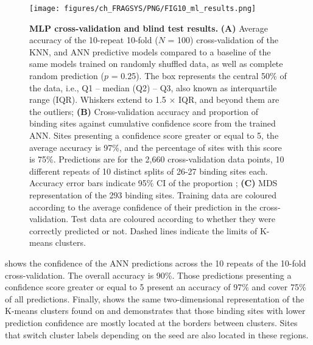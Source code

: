 \begin{figure}[ht!]
    \centering
    \texttt{[image: figures/ch\_FRAGSYS/PNG/FIG10\_ml\_results.png]}
    \caption[MLP cross-validation and blind test results]{\textbf{MLP cross-validation and blind test results.} \textbf{(A)} Average accuracy of the 10-repeat 10-fold ($N$ = 100) cross-validation of the KNN, and ANN predictive models compared to a baseline of the same models trained on randomly shuffled data, as well as complete random prediction ($p$ = 0.25). The box represents the central 50\% of the data, i.e., Q1 – median (Q2) – Q3, also known as interquartile range (IQR). Whiskers extend to 1.5 $\times$ IQR, and beyond them are the outliers; \textbf{(B)} Cross-validation accuracy and proportion of binding sites against cumulative confidence score from the trained ANN. Sites presenting a confidence score greater or equal to 5, the average accuracy is 97\%, and the percentage of sites with this score is 75\%. Predictions are for the 2,660 cross-validation data points, 10 different repeats of 10 distinct splits of 26-27 binding sites each. Accuracy error bars indicate 95\% CI of the proportion \cite{WILSON_197_PROP_CI}; \textbf{(C)} MDS representation of the 293 binding sites. Training data are coloured according to the average confidence of their prediction in the cross-validation. Test data are coloured according to whether they were correctly predicted or not. Dashed lines indicate the limits of K-means clusters.}
    \label{fig:MLP_CV_blind_test}
\end{figure}

 shows the confidence of the ANN predictions across the 10 repeats of the 10-fold cross-validation. The overall accuracy is 90\%. Those predictions presenting a confidence score greater or equal to 5 present an accuracy of 97\% and cover 75\% of all predictions. Finally,  shows the same two-dimensional representation of the K-means clusters found on  and demonstrates that those binding sites with lower prediction confidence are mostly located at the borders between clusters. Sites that switch cluster labels depending on the seed are also located in these regions.

